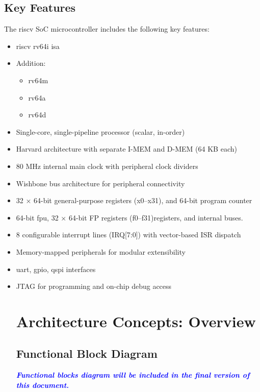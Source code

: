 \subsection{Key Features}
The \gls{riscv} \gls{SoC} microcontroller includes the following key features:
\begin{itemize}

      \item \gls{riscv} \gls{rv64i} \gls{isa}
      \item Addition:
            \begin{itemize}
                  \item \gls{rv64m}
                  \item \gls{rv64a}
                  \item \gls{rv64d}
            \end{itemize}
      \item Single-core, single-\gls{pipeline} processor (scalar, in-order)
      \item \gls{Harvard} architecture with separate \gls{I-MEM} and \gls{D-MEM} (64 KB each)
      \item 80 MHz internal main clock with peripheral clock dividers
      \item Wishbone bus architecture for peripheral connectivity
      \item 32 × 64-bit general-purpose registers (x0–x31),  and 64-bit program counter
      \item 64-bit \gls{fpu}, 32 × 64-bit FP registers (f0–f31)registers, and internal buses.
      \item 8 configurable interrupt lines (\gls{IRQ}[7:0]) with vector-based ISR dispatch
      \item Memory-mapped peripherals for modular extensibility
      \item \gls{uart}, \gls{gpio}, \gls{qspi} interfaces
      \item JTAG for programming and on-chip debug access

            \section{Architecture Concepts: Overview}

            \subsection{Functional Block Diagram}

            \textcolor{blue}{\textbf{\textit{Functional blocks diagram will be included in the final version of this document.}}}


\end{itemize}
